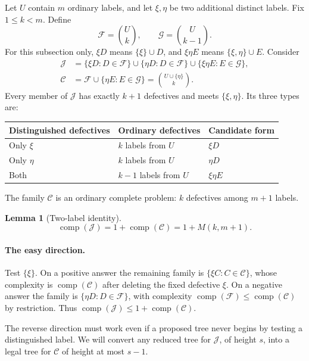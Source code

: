 \documentclass[11pt]{article}
\newtheorem{lemma}[theorem]{Lemma}
\theoremstyle{definition}
\theoremstyle{remark}
\newcommand{\Comp}{\operatorname{comp}}
\numberwithin{equation}{section}
\begin{document}
Let \(U\) contain \(m\) ordinary labels, and let \(\xi,\eta\) be two
additional distinct labels. Fix \(1\le k<m\). Define
\[
 \mathcal F=\binom Uk,\qquad \mathcal G=\binom U{k-1}.
\]
For this subsection only, \(\xi D\) means \(\{\xi\}\cup D\), and
\(\xi\eta E\) means \(\{\xi,\eta\}\cup E\).
Consider
\begin{align*}
 \mathcal J
 &=\{\xi D:D\in\mathcal F\}
   \cup\{\eta D:D\in\mathcal F\}
   \cup\{\xi\eta E:E\in\mathcal G\},\\
 \mathcal C
 &=\mathcal F\cup\{\eta E:E\in\mathcal G\}
   =\binom{U\cup\{\eta\}}k.
\end{align*}
Every member of \(\mathcal J\) has exactly \(k+1\) defectives and
meets \(\{\xi,\eta\}\). Its three types are:
\begin{center}
\begin{tabular}{lll}
\toprule
Distinguished defectives&Ordinary defectives&Candidate form\\
\midrule
Only \(\xi\)&\(k\) labels from \(U\)&\(\xi D\)\\
Only \(\eta\)&\(k\) labels from \(U\)&\(\eta D\)\\
Both&\(k-1\) labels from \(U\)&\(\xi\eta E\)\\
\bottomrule
\end{tabular}
\end{center}
The family \(\mathcal C\) is an ordinary complete problem: \(k\)
defectives among \(m+1\) labels.

\begin{lemma}[Two-label identity]\label{lem:two}
\[
 \Comp(\mathcal J)=1+\Comp(\mathcal C)=1+M(k,m+1).
\]
\end{lemma}

\paragraph{The easy direction.}
Test \(\{\xi\}\). On a positive answer the remaining family is
\(\{\xi C:C\in\mathcal C\}\), whose complexity is
\(\Comp(\mathcal C)\) after deleting the fixed defective \(\xi\).
On a negative answer the family is
\(\{\eta D:D\in\mathcal F\}\), with complexity
\(\Comp(\mathcal F)\le\Comp(\mathcal C)\) by restriction.
Thus \(\Comp(\mathcal J)\le1+\Comp(\mathcal C)\).

The reverse direction must work even if a proposed tree never begins
by testing a distinguished label. We will convert any reduced tree
for \(\mathcal J\), of height \(s\), into a legal tree for
\(\mathcal C\) of height at most \(s-1\).
\end{document}
